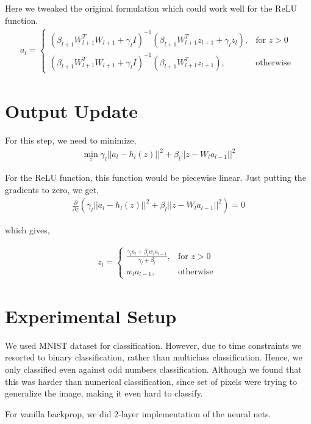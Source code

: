 \documentclass[12pt]{article}
\begin{document}
Here we tweaked the original formulation which could work well for the ReLU function.
\begin{align*}
	a_l = \begin{cases}
		(\beta_{l+1} W_{l+1}^TW_{l+1} + \gamma_l I)^{-1}(\beta_{l+1} W_{l+1}^Tz_{l+1} + \gamma_l z_l), & \text{for } z > 0 \\
		(\beta_{l+1} W_{l+1}^TW_{l+1} + \gamma_l I)^{-1}(\beta_{l+1} W_{l+1}^Tz_{l+1}), & \text{otherwise }
	\end{cases}
\end{align*}

\section{Output Update}

For this step, we need to minimize, 
\begin{align*}
\min_z \gamma_l || a_l - h_l(z) ||^2 + \beta_l || z - W_la_{l-1} ||^2
\end{align*}

For the ReLU function, this function would be piecewise linear. Just putting the gradients to zero, we get,
\begin{align*}
	\frac{\partial}{\partial z} \left(  \gamma_l || a_l - h_l(z) ||^2 + \beta_l || z - W_la_{l-1} ||^2 \right) = 0
\end{align*}

which gives,

\begin{align*}
	z_l = \begin{cases}
		\frac{\gamma_l a_l + \beta_l w_l a_{l-1}}{\gamma_l + \beta_l}, & \text{for } z > 0 \\
		w_la_{l-1}, & \text{otherwise }
	\end{cases}
\end{align*}

\section{Experimental Setup}
We used MNIST dataset for classification. 
However, due to time constraints we resorted to binary classification, rather than multiclass classification.
Hence, we only classified even against odd numbers classification.
Although we found that this was harder than numerical classification, since set of pixels were trying to generalize the image, making it even hard to classify.

For vanilla backprop, we did 2-layer implementation of the neural nets.
\end{document}
